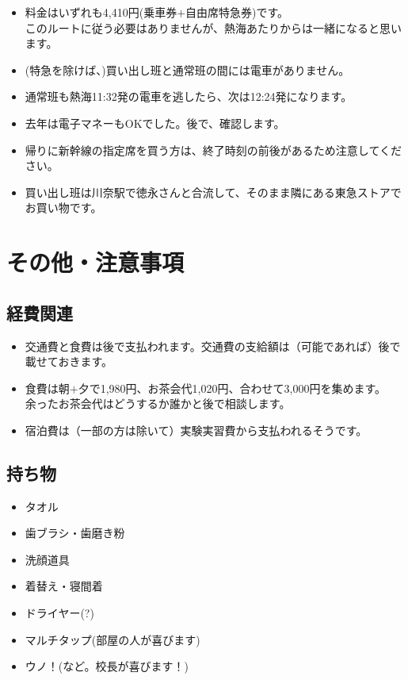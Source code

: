 \documentclass[unicode,a4paper,11pt]{ltjsarticle}
\begin{document}
\begin{itemize}
  \item
        料金はいずれも4,410円(乗車券$+$自由席特急券)です。\\
        このルートに従う必要はありませんが、熱海あたりからは一緒になると思います。
  \item
        (特急を除けば、)買い出し班と通常班の間には電車がありません。
  \item
        通常班も熱海11:32発の電車を逃したら、次は12:24発になります。
  \item
        去年は電子マネーもOKでした。後で、確認します。
  \item
        帰りに新幹線の指定席を買う方は、終了時刻の前後があるため注意してください。
  \item
        買い出し班は川奈駅で徳永さんと合流して、そのまま隣にある東急ストアでお買い物です。
\end{itemize}


\section{その他・注意事項}

\subsection*{経費関連}

\begin{itemize}
  \item
        交通費と食費は後で支払われます。交通費の支給額は（可能であれば）後で載せておきます。
  \item
        食費は朝$+$夕で1,980円、お茶会代1,020円、合わせて3,000円を集めます。\\
        余ったお茶会代はどうするか誰かと後で相談します。
  \item
        宿泊費は（一部の方は除いて）実験実習費から支払われるそうです。
\end{itemize}

\subsection*{持ち物}

\begin{itemize}
  \item
        タオル
  \item
        歯ブラシ・歯磨き粉
  \item
        洗顔道具
  \item
        着替え・寝間着
  \item
        ドライヤー(?)
  \item
        マルチタップ(部屋の人が喜びます)
  \item
        ウノ！(など。校長が喜びます！)
\end{itemize}
\end{document}
